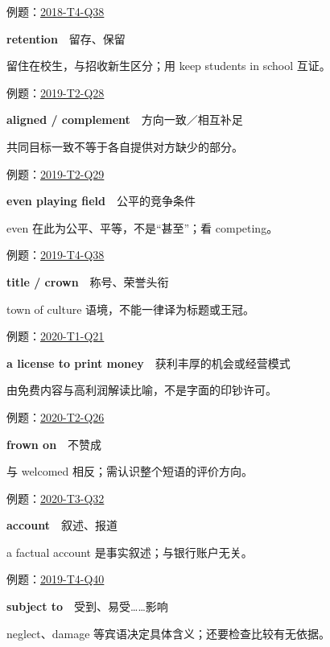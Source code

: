\documentclass[11pt,a4paper]{article}
\begin{document}
\noindent\small 例题：\hyperref[idx-2018-T4-Q38]{2018-T4-Q38}\normalsize\par\medskip
{}\noindent\textbf{retention}　留存、保留\par\nopagebreak
留住在校生，与招收新生区分；用 keep students in school 互证。

\noindent\small 例题：\hyperref[idx-2019-T2-Q28]{2019-T2-Q28}\normalsize\par\medskip
{}\noindent\textbf{aligned / complement}　方向一致／相互补足\par\nopagebreak
共同目标一致不等于各自提供对方缺少的部分。

\noindent\small 例题：\hyperref[idx-2019-T2-Q29]{2019-T2-Q29}\normalsize\par\medskip
{}\noindent\textbf{even playing field}　公平的竞争条件\par\nopagebreak
even 在此为公平、平等，不是“甚至”；看 competing。

\noindent\small 例题：\hyperref[idx-2019-T4-Q38]{2019-T4-Q38}\normalsize\par\medskip
{}\noindent\textbf{title / crown}　称号、荣誉头衔\par\nopagebreak
town of culture 语境，不能一律译为标题或王冠。

\noindent\small 例题：\hyperref[idx-2020-T1-Q21]{2020-T1-Q21}\normalsize\par\medskip
{}\noindent\textbf{a license to print money}　获利丰厚的机会或经营模式\par\nopagebreak
由免费内容与高利润解读比喻，不是字面的印钞许可。

\noindent\small 例题：\hyperref[idx-2020-T2-Q26]{2020-T2-Q26}\normalsize\par\medskip
{}\noindent\textbf{frown on}　不赞成\par\nopagebreak
与 welcomed 相反；需认识整个短语的评价方向。

\noindent\small 例题：\hyperref[idx-2020-T3-Q32]{2020-T3-Q32}\normalsize\par\medskip
{}\noindent\textbf{account}　叙述、报道\par\nopagebreak
a factual account 是事实叙述；与银行账户无关。

\noindent\small 例题：\hyperref[idx-2019-T4-Q40]{2019-T4-Q40}\normalsize\par\medskip
{}\noindent\textbf{subject to}　受到、易受……影响\par\nopagebreak
neglect、damage 等宾语决定具体含义；还要检查比较有无依据。
\end{document}
